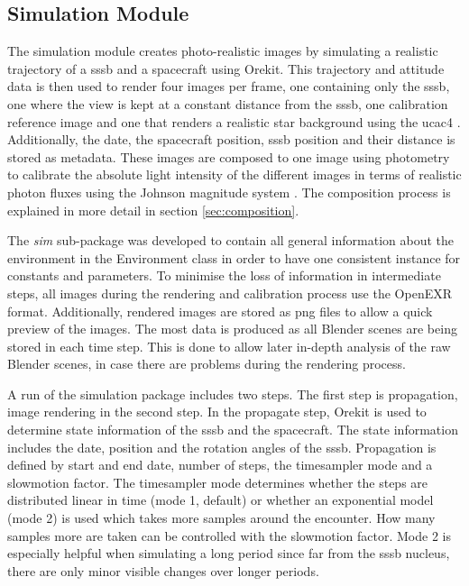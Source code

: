 \subsection{Simulation Module}
The simulation module creates photo-realistic images by simulating a realistic trajectory of a \gls{sssb} and a spacecraft using Orekit. This trajectory and attitude data is then used to render four images per frame, one containing only the \gls{sssb}, one where the view is kept at a constant distance from the \gls{sssb}, one calibration reference image and one that renders a realistic star background using the \gls{ucac4} \cite{zacharias2013fourthUCAC4}. Additionally, the date, the spacecraft position, \gls{sssb} position and their distance is stored as metadata. These images are composed to one image using photometry to calibrate the absolute light intensity of the different images in terms of realistic photon fluxes using the Johnson magnitude system \cite{bessel1979ubvri}. The composition process is explained in more detail in section \ref{sec:composition}.

The \textit{sim} sub-package was developed to contain all general information about the environment in the Environment class in order to have one consistent instance for constants and parameters. To minimise the loss of information in intermediate steps, all images during the rendering and calibration process use the OpenEXR format. Additionally, rendered images are stored as png files to allow a quick preview of the images. The most data is produced as all Blender scenes are being stored in each time step. This is done to allow later in-depth analysis of the raw Blender scenes, in case there are problems during the rendering process.

A run of the simulation package includes two steps. The first step is propagation, image rendering in the second step.
In the propagate step, Orekit is used to determine state information of the \gls{sssb} and the spacecraft. The state information includes the date, position and the rotation angles of the \gls{sssb}. Propagation is defined by start and end date, number of steps, the timesampler mode and a slowmotion factor.
The timesampler mode determines whether the steps are distributed linear in time (mode 1, default) or whether an exponential model (mode 2) is used which takes more samples around the encounter. How many samples more are taken can be controlled with the slowmotion factor. Mode 2 is especially helpful when simulating a long period since far from the \gls{sssb} nucleus, there are only minor visible changes over longer periods.

